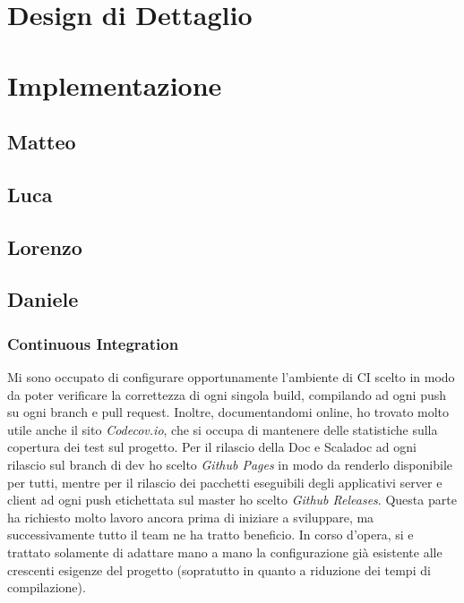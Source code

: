 \documentclass{article}
\begin{document}
    \newpage


    \section{Design di Dettaglio}\label{sec:design-di-dettaglio}
    

    \section{Implementazione}\label{sec:implementazione}

    \subsection{Matteo}

    \subsection{Luca}

    \subsection{Lorenzo}

    \subsection{Daniele}

    \subsubsection{Continuous Integration}
    Mi sono occupato di configurare opportunamente l'ambiente di CI scelto in modo da poter verificare la correttezza di ogni singola build, compilando ad ogni push su ogni branch e pull request.
    Inoltre, documentandomi online, ho trovato molto utile anche il sito \textit{Codecov.io}, che si occupa di mantenere delle statistiche sulla copertura dei test sul progetto.
    Per il rilascio della Doc e Scaladoc ad ogni rilascio sul branch di dev ho scelto \textit{Github Pages} in modo da renderlo disponibile per tutti, mentre per il rilascio dei pacchetti eseguibili degli applicativi server e client ad ogni push etichettata sul master ho scelto \textit{Github Releases}.
    Questa parte ha richiesto molto lavoro ancora prima di iniziare a sviluppare, ma successivamente tutto il team ne ha tratto beneficio.
    In corso d'opera, si e trattato solamente di adattare mano a mano la configurazione già esistente alle crescenti esigenze del progetto (sopratutto in quanto a riduzione dei tempi di compilazione).
\end{document}

